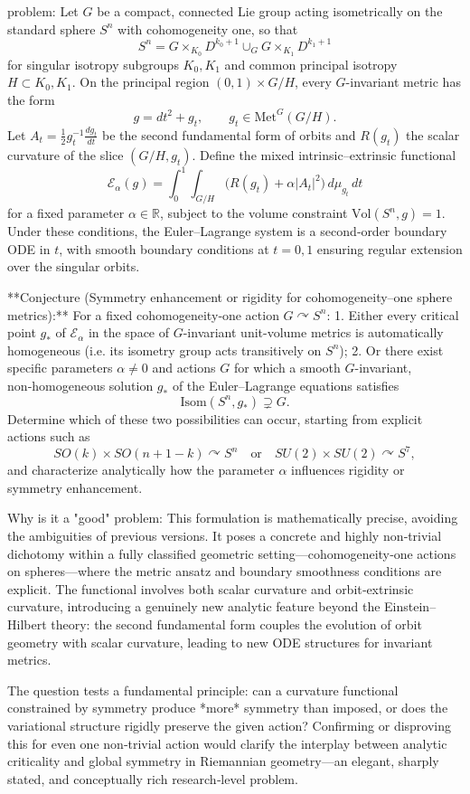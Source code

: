 problem:  
Let \(G\) be a compact, connected Lie group acting isometrically on the standard sphere \(S^n\) with cohomogeneity one, so that
\[
S^n = G \times_{K_0} D^{k_0+1} \cup_G G \times_{K_1} D^{k_1+1}
\]
for singular isotropy subgroups \(K_0, K_1\) and common principal isotropy \(H\subset K_0,K_1\).
On the principal region \((0,1) \times G/H\), every \(G\)-invariant metric has the form
\[
g = dt^2 + g_t, \qquad g_t \in \mathrm{Met}^G(G/H).
\]
Let \(A_t = \frac{1}{2} g_t^{-1} \frac{d g_t}{dt}\) be the second fundamental form of orbits and \(R(g_t)\) the scalar curvature of the slice \((G/H,g_t)\).
Define the mixed intrinsic–extrinsic functional
\[
\mathcal{E}_\alpha(g) = \int_0^1 \!\! \int_{G/H} \big(R(g_t) + \alpha |A_t|^2 \big) \, d\mu_{g_t}\, dt
\]
for a fixed parameter \(\alpha \in \mathbb{R}\), subject to the volume constraint \(\mathrm{Vol}(S^n, g)=1\).
Under these conditions, the Euler–Lagrange system is a second‑order boundary ODE in \(t\), with smooth boundary conditions at \(t=0,1\) ensuring regular extension over the singular orbits.

**Conjecture (Symmetry enhancement or rigidity for cohomogeneity–one sphere metrics):**  
For a fixed cohomogeneity‑one action \(G \curvearrowright S^n\):
1. Either every critical point \(g_*\) of \(\mathcal{E}_\alpha\) in the space of \(G\)-invariant unit-volume metrics is automatically homogeneous (i.e. its isometry group acts transitively on \(S^n\));  
2. Or there exist specific parameters \(\alpha \neq 0\) and actions \(G\) for which a smooth \(G\)-invariant, non‑homogeneous solution \(g_*\) of the Euler–Lagrange equations satisfies
   \[
   \mathrm{Isom}(S^n, g_*) \supsetneq G.
   \]
Determine which of these two possibilities can occur, starting from explicit actions such as 
\[
SO(k)\times SO(n+1-k)\curvearrowright S^n
\quad\text{or}\quad
SU(2)\times SU(2)\curvearrowright S^7,
\]
and characterize analytically how the parameter \(\alpha\) influences rigidity or symmetry enhancement.

Why is it a "good" problem:  
This formulation is mathematically precise, avoiding the ambiguities of previous versions. It poses a concrete and highly non‑trivial dichotomy within a fully classified geometric setting—cohomogeneity‑one actions on spheres—where the metric ansatz and boundary smoothness conditions are explicit. The functional involves both scalar curvature and orbit‑extrinsic curvature, introducing a genuinely new analytic feature beyond the Einstein–Hilbert theory: the second fundamental form couples the evolution of orbit geometry with scalar curvature, leading to new ODE structures for invariant metrics.

The question tests a fundamental principle: can a curvature functional constrained by symmetry produce *more* symmetry than imposed, or does the variational structure rigidly preserve the given action? Confirming or disproving this for even one non‑trivial action would clarify the interplay between analytic criticality and global symmetry in Riemannian geometry—an elegant, sharply stated, and conceptually rich research‑level problem.